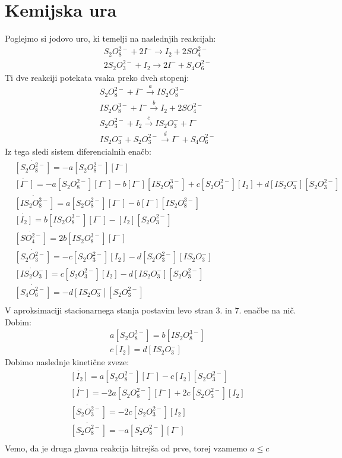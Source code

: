 \documentclass{article}
\begin{document}
\section{Kemijska ura}
Poglejmo si jodovo uro, ki temelji na naslednjih reakcijah:
\begin{align*}
&S_2O_8^{2-} +2I^{-} \rightarrow I_2 + 2SO_4^{2-} \\
&2S_2O_3^{2-} + I_2 \rightarrow 2I^{-} + S_4O_6^{2-}
\end{align*}
Ti dve reakciji potekata vsaka preko dveh stopenj:
\begin{align*}
&S_2O_8^{2-} + I^- \xrightarrow{a} IS_2O_8^{3-} \\
&IS_2O_8^{3-} + I^- \xrightarrow{b} I_2 + 2SO_4^{2-} \\
&S_2O_3^{2-} + I_2 \xrightarrow{c} IS_2O_3^- + I^- \\
&IS_2O_3^{-} + S_2O_3^{2-} \xrightarrow{d} I^- + S_4O_6^{2-}
\end{align*}
Iz tega sledi sistem diferencialnih enačb:
\begin{align*}
&\dot{[S_2O_8^{2-}]} = -a[S_2O_8^{2-}][I^-] \\
&\dot{[I^-]} = -a[S_2O_8^{2-}][I^-] - b[I^-][IS_2O_8^{3-}] +c[S_2O_3^{2-}][I_2] + d[IS_2O_3^-][S_2O_3^{2-}] \\
&\dot{[IS_2O_8^{3-}]} = a[S_2O_8^{2-}][I^-] - b[I^-][IS_2O_8^{3-}] \\
&\dot{[I_2]} = b[IS_2O_8^{3-}][I^-] - [I_2][S_2O_3^{2-}] \\
&\dot{[SO_4^{2-}]} = 2b[IS_2O_8^{3-}][I^-] \\
&\dot{[S_2O_3^{2-}]} = -c [S_2O_3^{2-}][I_2] -d[S_2O_3^{2-}][IS_2O_3^-] \\
&\dot{[IS_2O_3^-]} = c[S_2O_3^{2-}][I_2] - d [IS_2O_3^-][S_2O_3^{2-}] \\
&\dot{[S_4O_6^{2-}]} = -d [IS_2O_3^-][S_2O_3^{2-}] \\
\end{align*}
V aproksimaciji stacionarnega stanja postavim levo stran 3. in 7. enačbe na nič. Dobim:
\begin{align*}
&a[S_2O_8^{2-}] = b[IS_2O_8^{3-}] \\
&c[I_2] = d[IS_2O_3^-]
\end{align*}
Dobimo naslednje kinetične zveze:
\begin{align*}
&\dot{[I_2]} = a [S_2O_8^{2-}][I^-] - c[I_2][S_2O_3^{2-}] \\
&\dot{[I^-]} = -2a [S_2O_8^{2-}][I^-] +2c [S_2O_3^{2-}][I_2] \\
&\dot{[S_2O_3^{2-}]} = -2c [S_2O_3^{2-}][I_2] \\
&\dot{[S_2O_8^{2-}]} = -a[S_2O_8^{2-}][I^-] \\
\end{align*}
Vemo, da je druga glavna reakcija hitrejša od prve, torej vzamemo $a \leq c$
\end{document}
